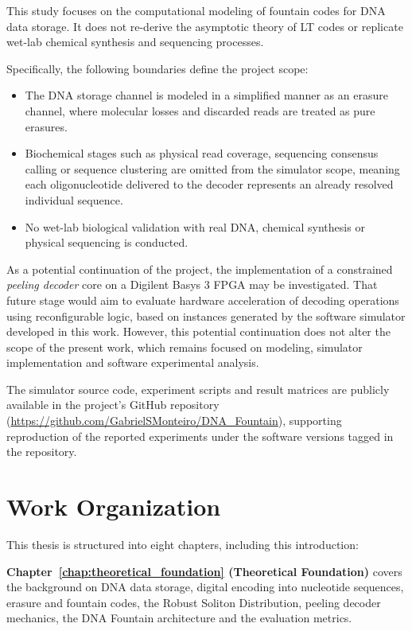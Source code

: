 This study focuses on the computational modeling of fountain codes for DNA data storage. It does not re-derive the asymptotic theory of LT codes or replicate wet-lab chemical synthesis and sequencing processes.

Specifically, the following boundaries define the project scope:

\begin{itemize}
    \item The DNA storage channel is modeled in a simplified manner as an erasure channel, where molecular losses and discarded reads are treated as pure erasures.
    
    \item Biochemical stages such as physical read coverage, sequencing consensus calling or sequence clustering are omitted from the simulator scope, meaning each oligonucleotide delivered to the decoder represents an already resolved individual sequence.
    
    \item No wet-lab biological validation with real DNA, chemical synthesis or physical sequencing is conducted.
\end{itemize}

As a potential continuation of the project, the implementation of a constrained \emph{peeling decoder} core on a Digilent Basys 3 FPGA may be investigated. That future stage would aim to evaluate hardware acceleration of decoding operations using reconfigurable logic, based on instances generated by the software simulator developed in this work. However, this potential continuation does not alter the scope of the present work, which remains focused on modeling, simulator implementation and software experimental analysis.

The simulator source code, experiment scripts and result matrices are publicly available in the project's GitHub repository (\url{https://github.com/GabrielSMonteiro/DNA_Fountain}), supporting reproduction of the reported experiments under the software versions tagged in the repository.

\section{Work Organization}
\label{sec:organization}

This thesis is structured into eight chapters, including this introduction:

\textbf{Chapter~\ref{chap:theoretical_foundation} (Theoretical Foundation)} covers the background on DNA data storage, digital encoding into nucleotide sequences, erasure and fountain codes, the Robust Soliton Distribution, peeling decoder mechanics, the DNA Fountain architecture and the evaluation metrics.

